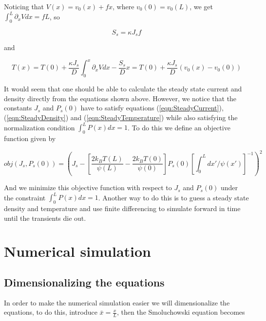 Noticing that $V(x) = v_0(x) + f x$, where $v_0(0) = v_0(L)$, we get $\int_0^L \partial_x V dx = f L$, so

\begin{equation}
S_s = \kappa J_s f
\end{equation}

and

\begin{equation}
T(x) = T(0) + \frac{\kappa J_s}{D} \int_0^x \partial_x V dx - \frac{S_s}{D}x = T(0) + \frac{\kappa J_s}{D} (v_0(x) - v_0(0)) \label{eqn:SteadyTemperature}
\end{equation}

It would seem that one should be able to calculate the steady state current and density directly from the equations shown above. However, we notice that the constants $J_s$ and $P_s(0)$ have to satisfy equations (\ref{eqn:SteadyCurrent}), (\ref{eqn:SteadyDensity}) and (\ref{eqn:SteadyTemperature}) while also satisfying the normalization condition $\int_0^L P(x) dx = 1$. To do this we define an objective function given by

\begin{equation}
obj(J_s, P_s(0)) = \left (J_s - \left [\frac{2 k_B T(L)}{\psi(L)} - \frac{2 k_B T(0)}{\psi(0)}  \right] P_s(0) \left [\int_0^L dx'/\psi(x') \right]^{-1} \right)^2  \label{eqn:Objective}
\end{equation}

And we minimize this objective function with respect to $J_s$ and $P_s(0)$ under the constraint $\int_0^L P(x) dx = 1$. Another way to do this is to guess a steady state density and temperature and use finite differencing to simulate forward in time until the transients die out.


\section{Numerical simulation} \label{numerics}

\subsection{Dimensionalizing the equations}

In order to make the numerical simulation easier we will dimensionalize the equations, to do this, introduce $\bar{x} = \frac{x}{L}$, then the Smoluchowski equation becomes

